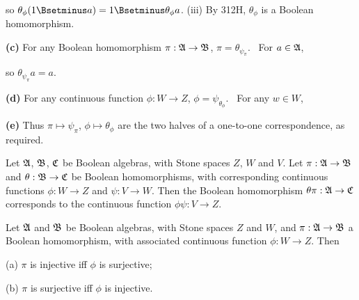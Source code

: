 {\noindent so $\theta_{\phi}(1\Bsetminus a)=1\Bsetminus\theta_{\phi}a$.
(iii) By 312H, $\theta_{\phi}$ is a Boolean homomorphism.   \Qed

\medskip

{\bf (c)} For any Boolean homomorphism $\pi:\frak A\to\frak B$,
$\pi=\theta_{\psi_{\pi}}$.   \Prf\ For $a\in\frak A$,


\noindent so $\theta_{\psi_{\pi}}a=a$.   \Qed

\medskip

{\bf (d)} For any continuous function $\phi:W\to Z$,
$\phi=\psi_{\theta_{\phi}}$.   \Prf\ For any $w\in W$,


\medskip

{\bf (e)} Thus $\pi\mapsto\psi_{\pi}$, $\phi\mapsto\theta_{\phi}$ are
the two halves of a one-to-one correspondence, as required.
}%

Let $\frak A$, $\frak B$, $\frak C$ be Boolean
algebras, with Stone spaces $Z$, $W$ and $V$.   Let
$\pi:\frak A\to\frak B$ and $\theta:\frak B\to\frak C$ be Boolean
homomorphisms, with
corresponding continuous functions $\phi:W\to Z$ and $\psi:V\to W$.
Then the Boolean homomorphism $\theta\pi:\frak A\to\frak C$ corresponds
to the continuous function $\phi\psi:V\to Z$.


 Let $\frak A$ and $\frak B$ be Boolean
algebras, with Stone spaces $Z$ and $W$, and $\pi:\frak A\to\frak B$ a
Boolean homomorphism, with associated continuous function $\phi:W\to Z$.
Then

(a) $\pi$ is injective iff $\phi$ is surjective;

(b) $\pi$ is surjective iff $\phi$ is injective.

